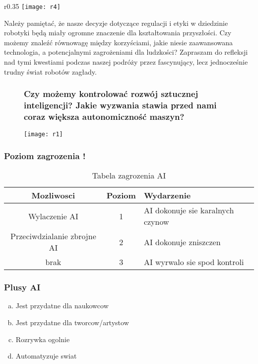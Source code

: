 \documentclass[9pt]{beamer}
\begin{document}
\begin{frame}
\label{r4}
\begin{wrapfigure}{r}{0.35\textwidth}
\texttt{[image: r4]}

\end{wrapfigure}

Należy pamiętać, że nasze decyzje dotyczące regulacji i etyki w dziedzinie robotyki będą miały ogromne znaczenie dla kształtowania przyszłości. Czy możemy znaleźć równowagę między korzyściami, jakie niesie zaawansowana technologia, a potencjalnymi zagrożeniami dla ludzkości? Zapraszam do refleksji nad tymi kwestiami podczas naszej podróży przez fascynujący, lecz jednocześnie trudny świat robotów zagłady.

\end{frame}




\begin{frame}

\begin{figure}
\frametitle{Czy możemy kontrolować rozwój sztucznej inteligencji? Jakie wyzwania stawia przed nami coraz większa autonomiczność maszyn?}
\texttt{[image: r1]}
\end{figure}

\end{frame}



\begin{frame}
\frametitle{Poziom zagrozenia !}
\begin{table}
    \begin{tabular}{|c|c|l|}
      \hline
      Mozliwosci & Poziom & Wydarzenie \\
      \hline
      Wylaczenie AI & 1 & AI dokonuje sie karalnych czynow \\
      Przeciwdzialanie zbrojne AI & 2 & AI dokonuje zniszczen \\
      brak & 3 & AI wyrwalo sie spod kontroli\\
      \hline
    \end{tabular}
    \caption{Tabela zagrozenia AI}
  \end{table}
\end{frame}

\begin{frame}
\frametitle{Plusy AI\cite{Plusy}}
\begin{enumerate}[a)]
\item Jest przydatne dla naukowcow
\pause
\item  Jest przydatne dla tworcow/artystow
\pause
\item Rozrywka ogolnie
\pause
\item Automatyzuje swiat
\pause
\end{enumerate}

\end{frame}
\end{document}
